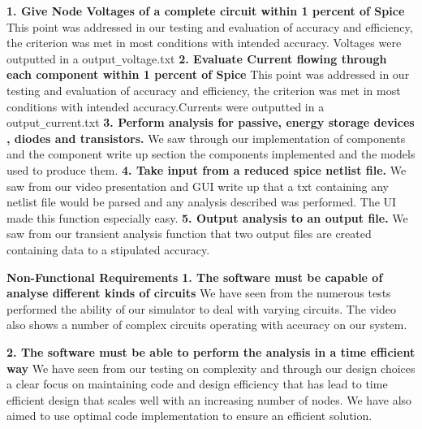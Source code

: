 \documentclass{article}
\begin{document}
\medbreak

\textbf{1. Give Node Voltages of a complete circuit within 1 percent of Spice}
\newline
This point was addressed in our testing and evaluation of accuracy and efficiency, the criterion was met in most conditions with intended accuracy. Voltages were outputted in a output\verb|_|voltage.txt
\smallbreak
\textbf{2. Evaluate Current flowing through each component within 1 percent of Spice}
\newline
This point was addressed in our testing and evaluation of accuracy and efficiency, the criterion was met in most conditions with intended accuracy.Currents were outputted in a output\verb|_|current.txt
\smallbreak
\textbf{3. Perform analysis for passive, energy storage devices , diodes and transistors.}
\newline
We saw through our implementation of components and the component write up section the components implemented and the models used to produce them.
\smallbreak
\textbf{4. Take input from a reduced spice netlist file.}
\newline
We saw from our video presentation and GUI write up that a txt containing any netlist file would be parsed and any analysis described was performed. The UI made this function especially easy.
\smallbreak
\textbf{5. Output analysis to an output file.}
We saw from our transient analysis function that two output files are created containing data to a stipulated accuracy.


\bigbreak

\textbf{Non-Functional Requirements}
\medbreak
\textbf{1. The software must be capable of analyse different kinds of circuits}
\newline
We have seen from the numerous tests performed the ability of our simulator to deal with varying circuits. The video also shows a number of complex circuits operating with accuracy on our system. 

\smallbreak

\textbf{2. The software must be able to perform the analysis in a time efficient way}
\newline
We have seen from our testing on complexity and through our design choices a clear focus on maintaining code and design efficiency that has lead to time efficient design that scales well with an increasing number of nodes. We have also aimed to use optimal code implementation to ensure an efficient solution. 



\newpage



\end{document}
